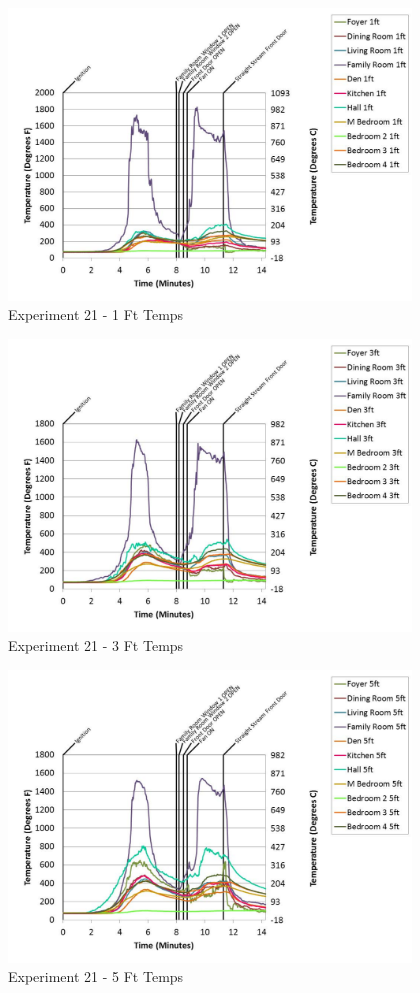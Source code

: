 \documentclass{article}
\begin{document}
\begin{appendices}
	\begin{figure}[h!]
		\centering
		\includegraphics[height=3.05in]{0_Images/Results_Charts/Exp_21_Charts/1FtTemps.pdf}
		\caption{Experiment 21 - 1 Ft Temps}
	\end{figure}
 

	\begin{figure}[h!]
		\centering
		\includegraphics[height=3.05in]{0_Images/Results_Charts/Exp_21_Charts/3FtTemps.pdf}
		\caption{Experiment 21 - 3 Ft Temps}
	\end{figure}
 
	\clearpage

	\begin{figure}[h!]
		\centering
		\includegraphics[height=3.05in]{0_Images/Results_Charts/Exp_21_Charts/5FtTemps.pdf}
		\caption{Experiment 21 - 5 Ft Temps}
	\end{figure}
 


\end{appendices}
\end{document}
